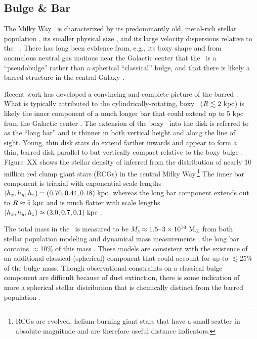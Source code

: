 \subsection{Bulge \& Bar}

The Milky Way \mwbulge\ is characterized by its predominantly old, metal-rich
stellar population \citep[$t_{\rm age} \gtrsim 5~{\rm Gyr}$, ${[{\rm Fe}/{\rm
H}]} \gtrsim -0.25$;][]{todo}, its smaller physical size \citep[$R \lesssim
1$--$2~\kpc$;][]{todo}, and its large velocity dispersions relative to the
\mwdisk\ \citep[$\sigma_v \sim 100~\kms$;][]{todo}. There has long been evidence
from, e.g., its boxy shape and from anomalous neutral gas motions near the
Galactic center that the \mwbulge\ is a ``pseudobulge'' rather than a spherical
``classical'' bulge, and that there is likely a barred structure in the central
Galaxy \citep{blitz91, binney91, weiland94, binney97}.

Recent work has developed a convincing and complete picture of the barred
\mwbulge. What is typically attributed to the cylindrically-rotating, boxy
\mwbulge\ ($R \lesssim 2~\mathrm{kpc}$) is likely the inner component of a much longer
bar that could extend up to 5 kpc from the Galactic center \citep{wegg13,
wegg15}. The extension of the boxy \mwbulge\ into the disk is referred to as the
``long bar'' and is thinner in both vertical height and along the line of sight.
Young, thin disk stars do extend farther inwards and appear to form a thin,
barred disk parallel to but vertically compact relative to the boxy bulge
\citep{dekany15}. Figure~XX shows the stellar density of  inferred
from the distribution of nearly 10 million red clump giant stars (RCGs) in the
central Milky Way.\footnote{RCGs are evolved, helium-burning giant stars that
have a small scatter in absolute magnitude and are therefore useful distance
indicators.} The inner bar component is triaxial with exponential scale lengths
$(h_x, h_y, h_z) = (0.70, 0.44, 0.18)~\mathrm{kpc}$, whereas the long bar component
extends out to $R\approx 5~\mathrm{kpc}$ and is much flatter with scale lengths $(h_x,
h_y, h_z) \approx (3.0, 0.7, 0.1)~\mathrm{kpc}$ \citep{wegg15}.

The total mass in the \mwbulge\ is measured to be $M_b \approx 1.5$--$3 \times
10^{10}~\mathrm{M}_\odot$ from both stellar population modeling \citep{dwek95, valenti15}
and dynamical mass measurements \citep{zhao94, portail15}; the long bar contains
$\approx$10\% of this mass \citep{wegg15}. These models are consistent with the
existence of an additional classical (spherical) component that could account
for up to $\lesssim 25\%$ of the bulge mass. Though observational constraints on
a classical bulge component are difficult because of dust extinction, there is
some indication of more a spherical stellar distribution that is chemically
distinct from the barred population \citep{ness13a,ness13b, todo}.

